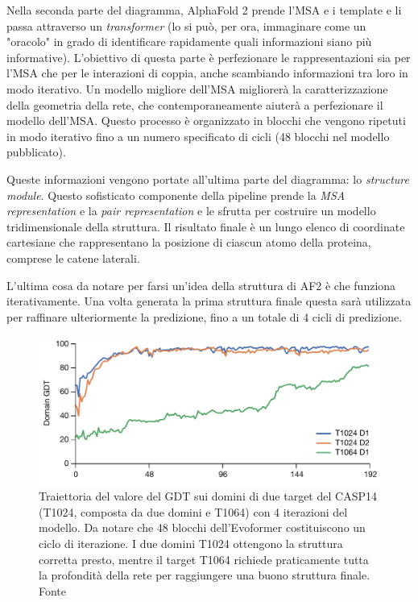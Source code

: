 \par Nella seconda parte del diagramma, AlphaFold 2 prende l'MSA e i template e li passa attraverso un \textit{transformer} (lo si può, per ora, immaginare come un "oracolo" in grado di identificare rapidamente quali informazioni siano più informative). L'obiettivo di questa parte è perfezionare le rappresentazioni sia per l'MSA che per le interazioni di coppia, anche scambiando informazioni tra loro in modo iterativo. Un modello migliore dell'MSA migliorerà la caratterizzazione della geometria della rete, che contemporaneamente aiuterà a perfezionare il modello dell'MSA. Questo processo è organizzato in blocchi che vengono ripetuti in modo iterativo fino a un numero specificato di cicli (48 blocchi nel modello pubblicato).

\par Queste informazioni vengono portate all'ultima parte del diagramma: lo \textit{structure module}. Questo sofisticato componente della pipeline prende la \textit{MSA representation} e la \textit{pair representation} e le sfrutta per costruire un modello tridimensionale della struttura. Il risultato finale è un lungo elenco di coordinate cartesiane che rappresentano la posizione di ciascun atomo della proteina, comprese le catene laterali.

\par L'ultima cosa da notare per farsi un'idea della struttura di AF2 è che funziona iterativamente. Una volta generata la prima struttura finale questa sarà utilizzata per raffinare ulteriormente la predizione, fino a un totale di 4 cicli di predizione.

\begin{figure}[!htb]
	\centering
	\includegraphics[scale=0.4]{images/af2-iterazioni.png}
	\caption{Traiettoria del valore del GDT sui domini di due target del CASP14 (T1024, composta da due domini e T1064) con 4 iterazioni del modello. Da notare che 48 blocchi dell'Evoformer costituiscono un ciclo di iterazione. I due domini T1024 ottengono la struttura corretta presto, mentre il target T1064 richiede praticamente tutta la profondità della rete per raggiungere una buono struttura finale. Fonte\cite{jumper2021highly}}
	\label{fig:af2-iterazioni}
\end{figure}

